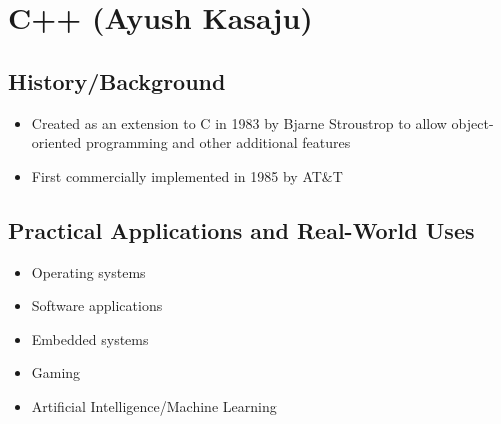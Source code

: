 \section{C++ (Ayush Kasaju)}

\subsection{History/Background}
\begin{itemize}
	\item Created as an extension to C in 1983 by Bjarne Stroustrop to allow object-oriented programming and other additional features
	\item First commercially implemented in 1985 by AT\&T
\end{itemize}

\subsection{Practical Applications and Real-World Uses}
\begin{itemize}
	\item Operating systems
	\item Software applications
	\item Embedded systems
	\item Gaming
	\item Artificial Intelligence/Machine Learning
\end{itemize}

